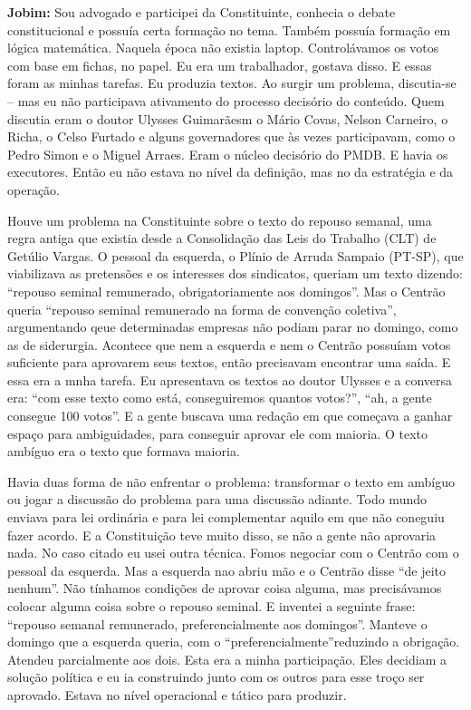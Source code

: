\textbf{Jobim:} Sou advogado e participei da Constituinte, conhecia o
debate constitucional e possuía certa formação no tema. Também possuía
formação em lógica matemática. Naquela época não existia laptop.
Controlávamos os votos com base em fichas, no papel. Eu era um
trabalhador, gostava disso. E essas foram as minhas tarefas. Eu produzia
textos. Ao surgir um problema, discutia-se -- mas eu não participava
ativamento do processo decisório do conteúdo. Quem discutia eram o
doutor Ulysses Guimarãesm o Mário Covas, Nelson Carneiro, o Richa, o
Celso Furtado e alguns governadores que às vezes participavam, como o
Pedro Simon e o Miguel Arraes. Eram o núcleo decisório do PMDB. E havia
os executores. Então eu não estava no nível da definição, mas no da
estratégia e da operação.

Houve um problema na Constituinte sobre o texto do repouso semanal, uma
regra antiga que existia desde a Consolidação das Leis do Trabalho (CLT)
de Getúlio Vargas. O pessoal da esquerda, o Plínio de Arruda Sampaio
(PT-SP), que viabilizava as pretensões e os interesses dos sindicatos,
queriam um texto dizendo: ``repouso seminal remunerado, obrigatoriamente
aos domingos''. Mas o Centrão queria ``repouso seminal remunerado na
forma de convenção coletiva'', argumentando qeue determinadas empresas
não podiam parar no domingo, como as de siderurgia. Acontece que nem a
esquerda e nem o Centrão possuíam votos suficiente para aprovarem seus
textos, então precisavam encontrar uma saída. E essa era a mnha tarefa.
Eu apresentava os textos ao doutor Ulysses e a conversa era: ``com esse
texto como está, conseguiremos quantos votos?'', ``ah, a gente consegue
100 votos''. E a gente buscava uma redação em que começava a ganhar
espaço para ambiguidades, para conseguir aprovar ele com maioria. O
texto ambíguo era o texto que formava maioria.

Havia duas forma de não enfrentar o problema: transformar o texto em
ambíguo ou jogar a discussão do problema para uma discussão adiante.
Todo mundo enviava para lei ordinária e para lei complementar aquilo em
que não coneguiu fazer acordo. E a Constituição teve muito disso, se não
a gente não aprovaria nada. No caso citado eu usei outra técnica. Fomos
negociar com o Centrão com o pessoal da esquerda. Mas a esquerda nao
abriu mão e o Centrão disse ``de jeito nenhum''. Não tínhamos condições
de aprovar coisa alguma, mas precisávamos colocar alguma coisa sobre o
repouso seminal. E inventei a seguinte frase: ``repouso semanal
remunerado, preferencialmente aos domingos''. Manteve o domingo que a
esquerda queria, com o ``preferencialmente''reduzindo a obrigação.
Atendeu parcialmente aos dois. Esta era a minha participação. Eles
decidiam a solução política e eu ia construindo junto com os outros para
esse troço ser aprovado. Estava no nível operacional e tático para
produzir.

